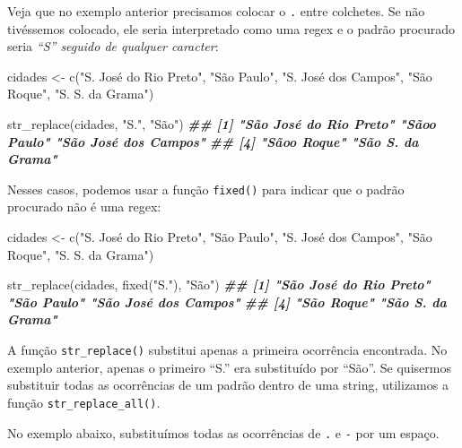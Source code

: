 \documentclass[
]{book}
\newenvironment{Shaded}{\begin{snugshade}}{\end{snugshade}}
\newcommand{\DocumentationTok}[1]{\textcolor[rgb]{0.56,0.35,0.01}{\textbf{\textit{#1}}}}
\newcommand{\FunctionTok}[1]{\textcolor[rgb]{0.00,0.00,0.00}{#1}}
\newcommand{\NormalTok}[1]{#1}
\newcommand{\OtherTok}[1]{\textcolor[rgb]{0.56,0.35,0.01}{#1}}
\newcommand{\StringTok}[1]{\textcolor[rgb]{0.31,0.60,0.02}{#1}}
\begin{document}
Veja que no exemplo anterior precisamos colocar o \texttt{.} entre colchetes. Se não tivéssemos colocado, ele seria interpretado como uma regex e o padrão procurado seria \emph{``S'' seguido de qualquer caracter}:

\begin{Shaded}
\begin{Highlighting}[]
\NormalTok{cidades }\OtherTok{\textless{}{-}} \FunctionTok{c}\NormalTok{(}\StringTok{"S. José do Rio Preto"}\NormalTok{, }\StringTok{"São Paulo"}\NormalTok{, }\StringTok{"S. José dos Campos"}\NormalTok{, }\StringTok{"São Roque"}\NormalTok{, }\StringTok{"S. S. da Grama"}\NormalTok{)}

\FunctionTok{str\_replace}\NormalTok{(cidades, }\StringTok{"S."}\NormalTok{, }\StringTok{"São"}\NormalTok{)}
\DocumentationTok{\#\# [1] "São José do Rio Preto" "Sãoo Paulo"            "São José dos Campos"  }
\DocumentationTok{\#\# [4] "Sãoo Roque"            "São S. da Grama"}
\end{Highlighting}
\end{Shaded}

Nesses casos, podemos usar a função \texttt{fixed()} para indicar que o padrão procurado não é uma regex:

\begin{Shaded}
\begin{Highlighting}[]
\NormalTok{cidades }\OtherTok{\textless{}{-}} \FunctionTok{c}\NormalTok{(}\StringTok{"S. José do Rio Preto"}\NormalTok{, }\StringTok{"São Paulo"}\NormalTok{, }\StringTok{"S. José dos Campos"}\NormalTok{, }\StringTok{"São Roque"}\NormalTok{, }\StringTok{"S. S. da Grama"}\NormalTok{)}

\FunctionTok{str\_replace}\NormalTok{(cidades, }\FunctionTok{fixed}\NormalTok{(}\StringTok{"S."}\NormalTok{), }\StringTok{"São"}\NormalTok{)}
\DocumentationTok{\#\# [1] "São José do Rio Preto" "São Paulo"             "São José dos Campos"  }
\DocumentationTok{\#\# [4] "São Roque"             "São S. da Grama"}
\end{Highlighting}
\end{Shaded}

A função \texttt{str\_replace()} substitui apenas a primeira ocorrência encontrada. No exemplo anterior, apenas o primeiro ``S.'' era substituído por ``São''. Se quisermos substituir todas as ocorrências de um padrão dentro de uma string, utilizamos a função \texttt{str\_replace\_all()}.

No exemplo abaixo, substituímos todas as ocorrências de \texttt{.} e \texttt{-} por um espaço.
\end{document}
